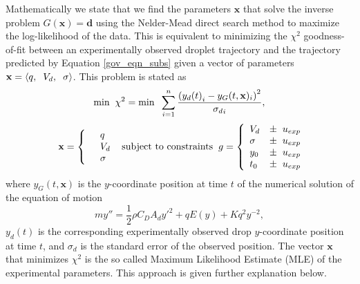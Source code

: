\documentclass[12pt,a4paper,oneside]{book}
\begin{document}
Mathematically we state that we find the parameters $\mathbf{x}$ that solve the inverse problem $G(\mathbf{x}) = \mathbf{d}$ using the Nelder-Mead direct search method to maximize the log-likelihood of the data. This is equivalent to minimizing the $\chi^2$ goodness-of-fit between an experimentally observed droplet trajectory and the trajectory predicted by Equation \ref{gov_eqn_subs} given a vector of parameters $\mathbf{x} = \left\langle q, \hspace{2 mm} V_d, \hspace{2 mm} \sigma \right\rangle$. This problem is stated as  
\[
\mbox{min} \hspace{2 mm} \chi^2 = \mbox{min} \hspace{2 mm} \sum^n_{i=1} \frac{\left({y_d(t)}_i - y_G(t, \mathbf{x})_i \right)^2}{{\sigma_d}_i},
\]
\begin{eqnarray*} \mbox{} \hspace{2 mm} \begin{split} \mathbf{x} = \left\{ \begin{array}{ll}      & q\\
		  &	V_d\\
          & \sigma 
          \end{array} \right. 
          \end{split} \hspace{2 mm} \mbox{subject to constraints} \hspace{2 mm} \begin{split}
          g = \left\{ \begin{array}{ll}
           V_d &\pm \hspace{2 mm} u_{exp}\\
      	   \sigma &\pm  \hspace{2 mm} u_{exp}\\
      	   y_0 &\pm \hspace{2 mm} u_{exp}\\
      	   t_0 &\pm \hspace{2 mm} u_{exp}\\
          \end{array} \right. 
          \end{split}
\end{eqnarray*}
where $y_G(t, \mathbf{x})$ is the $y$-coordinate position at time $t$ of the numerical solution of the equation of motion
\[
m y'' = \frac{1}{2} \rho C_D A_d {y'}^2 + q E(y) + K q^2 y^{-2}, \]
$y_d(t)$ is the corresponding experimentally observed drop $y$-coordinate position at time $t$, and $\sigma_d$ is the standard error of the observed position. The vector $\mathbf{x}$ that minimizes $\chi^2$ is the so called Maximum Likelihood Estimate (MLE) of the experimental parameters. This approach is given further explanation below.
\end{document}
